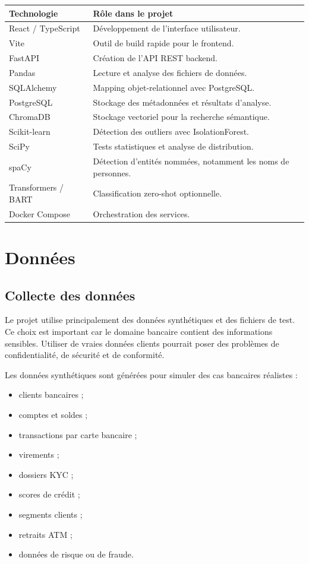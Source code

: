 \documentclass[12pt,a4paper]{report}
\begin{document}
\begin{longtable}{p{4cm}p{10cm}}
\toprule
\textbf{Technologie} & \textbf{Rôle dans le projet} \\
\midrule
React / TypeScript & Développement de l'interface utilisateur. \\
Vite & Outil de build rapide pour le frontend. \\
FastAPI & Création de l'API REST backend. \\
Pandas & Lecture et analyse des fichiers de données. \\
SQLAlchemy & Mapping objet-relationnel avec PostgreSQL. \\
PostgreSQL & Stockage des métadonnées et résultats d'analyse. \\
ChromaDB & Stockage vectoriel pour la recherche sémantique. \\
Scikit-learn & Détection des outliers avec IsolationForest. \\
SciPy & Tests statistiques et analyse de distribution. \\
spaCy & Détection d'entités nommées, notamment les noms de personnes. \\
Transformers / BART & Classification zero-shot optionnelle. \\
Docker Compose & Orchestration des services. \\
\bottomrule
\end{longtable}

\chapter{Données}

\section{Collecte des données}

Le projet utilise principalement des données synthétiques et des fichiers de test. Ce choix est important car le domaine bancaire contient des informations sensibles. Utiliser de vraies données clients pourrait poser des problèmes de confidentialité, de sécurité et de conformité.

Les données synthétiques sont générées pour simuler des cas bancaires réalistes :

\begin{itemize}
    \item clients bancaires ;
    \item comptes et soldes ;
    \item transactions par carte bancaire ;
    \item virements ;
    \item dossiers KYC ;
    \item scores de crédit ;
    \item segments clients ;
    \item retraits ATM ;
    \item données de risque ou de fraude.
\end{itemize}
\end{document}
